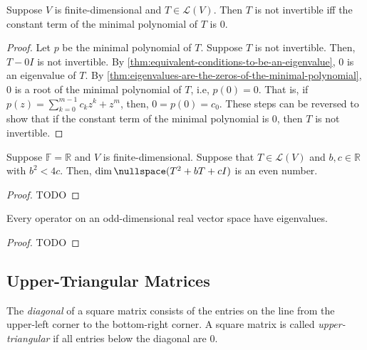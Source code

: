 \documentclass{article}
\begin{document}
\begin{theorem}
  \label{thm:T-not-invertible-iff-constant-term-of-minimal-polynomial-of-T-is-0}
  Suppose $V$ is finite-dimensional and $T \in \mathcal{L}(V)$. Then
  $T$ is not invertible iff the constant term of the minimal
  polynomial of $T$ is $0$.
\end{theorem}
\begin{proof}
  Let $p$ be the minimal polynomial of $T$.
  Suppose $T$ is not invertible. Then, $T - 0I$ is not invertible. By
  \cref{thm:equivalent-conditions-to-be-an-eigenvalue}, $0$ is an
  eigenvalue of $T$. By
  \cref{thm:eigenvalues-are-the-zeros-of-the-minimal-polynomial}, $0$
  is a root of the minimal polynomial of $T$, i.e, $p(0) = 0$. That
  is, if $p(z) = \sum_{k=0}^{m-1} c_k z^k + z^m$, then, $0 = p(0) =
  c_0$. These steps can be reversed to show that if the constant term
  of the minimal polynomial is $0$, then $T$ is not invertible.
\end{proof}

\begin{theorem}
  \label{thm:even-dimensional-null-space}
  Suppose $\mathbb{F} = \mathbb{R}$ and $V$ is
  finite-dimensional. Suppose that $T \in \mathcal{L}(V)$ and $b, c
  \in \mathbb{R}$ with $b^2 < 4c$. Then, $\dim \nullspace (T^2 + bT +
  cI)$ is an even number.
\end{theorem}
\begin{proof}
  TODO
\end{proof}

\begin{theorem}
  \label{thm:operators-on-real-odd-dimensional-space-have-eigenvalues}
  Every operator on an odd-dimensional real vector space have eigenvalues.
\end{theorem}
\begin{proof}
  TODO
\end{proof}

\subsection{Upper-Triangular Matrices}

\begin{definition}
  The \textit{diagonal} of a square matrix consists of the entries on
  the line from the upper-left corner to the bottom-right corner. A
  square matrix is called \textit{upper-triangular} if all entries
  below the diagonal are $0$.
\end{definition}
\end{document}
